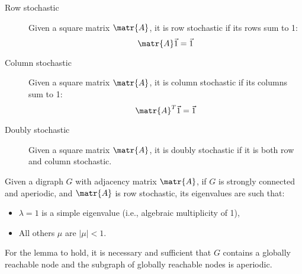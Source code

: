 \begin{description}
    \item[Row stochastic] 
        Given a square matrix $\matr{A}$, it is row stochastic if its rows sum to 1:
        \[ \matr{A}\vec{1} = \vec{1} \]

    \item[Column stochastic] 
        Given a square matrix $\matr{A}$, it is column stochastic if its columns sum to 1:
        \[ \matr{A}^T\vec{1} = \vec{1} \]

    \item[Doubly stochastic] 
        Given a square matrix $\matr{A}$, it is doubly stochastic if it is both row and column stochastic.
\end{description}

\begin{lemma}
    Given a digraph $G$ with adjacency matrix $\matr{A}$, if $G$ is strongly connected and aperiodic, and $\matr{A}$ is row stochastic, its eigenvalues are such that:
    \begin{itemize}
        \item $\lambda = 1$ is a simple eigenvalue (i.e., algebraic multiplicity of 1),
        \item All others $\mu$ are $|\mu| < 1$.
    \end{itemize}

    \begin{remark}
        For the lemma to hold, it is necessary and sufficient that $G$ contains a globally reachable node and the subgraph of globally reachable nodes is aperiodic.
    \end{remark}
\end{lemma}

